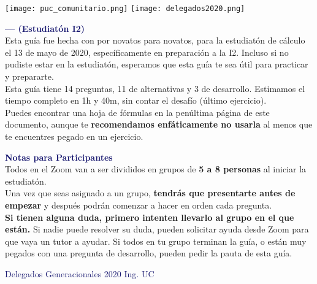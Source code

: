 
\begin{coverpages}
    \begin{flushleft}

        \texttt{[image: puc\_comunitario.png]}
        \texttt{[image: delegados2020.png]} \\ \vspace{10mm}

        \textcolor{MidnightBlue}{\textbf{\Large \theCourseCode{} \theCourse{} --- \theExamDate{} (Estudiatón I2)}} \\[\baselineskip]
        \vspace{10mm}
        Esta guía fue hecha con {\emoji {}} por novatos para novatos, para la estudiatón de cálculo el 13 de mayo de 2020, específicamente en preparación a la I2. Incluso si no pudiste estar en la estudiatón, esperamos que esta guía te sea útil para practicar y prepararte.\\[\baselineskip]

        Esta guía tiene 14 preguntas, 11 de alternativas y 3 de desarrollo. Estimamos el tiempo completo en 1h y 40m, sin contar el desafío (último ejercicio).\\[\baselineskip]

        Puedes encontrar una hoja de fórmulas en la penúltima página de este documento, aunque te \textbf{recomendamos enfáticamente no usarla} al menos que te encuentres pegado en un ejercicio.

        \vfill
        \textcolor{MidnightBlue}{\textbf{\large Notas para Participantes}}\\

        Todos en el Zoom van a ser divididos en grupos de \textbf{5 a 8 personas} al iniciar la estudiatón.\\ Una vez que seas asignado a un grupo, \textbf{tendrás que presentarte antes de empezar} y después podrán comenzar a hacer en orden cada pregunta.\\[\baselineskip]

        \textbf{Si tienen alguna duda, primero intenten llevarlo al grupo en el que están.} Si nadie puede resolver su duda, pueden solicitar ayuda desde Zoom para que vaya un tutor a ayudar. Si todos en tu grupo terminan la guía, o están muy pegados con una pregunta de desarrollo, pueden pedir la pauta de esta guía.

        \vspace{3mm} \textcolor{MidnightBlue}{\small Delegados Generacionales 2020 Ing. UC}
    \end{flushleft}
\end{coverpages}
\newpage
%
